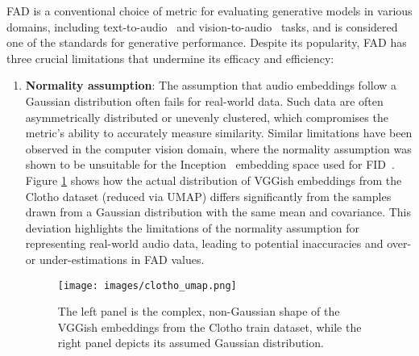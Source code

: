 FAD is a conventional choice of metric for evaluating generative models in various domains, including text-to-audio~\cite{donahue2018adversarial,liu2023audioldm,huang2023makeanaudio,tango,audiogen,t-foley,audioldm2,consistencytta,tango2,tango_llm,auffusion,stableaudio_open,ezaudio} and vision-to-audio~\cite{comunita2024syncfusion,video-foley,rewas,frieren,maskvat,v-aura,vatt,multifoley,ssv2a,vintage,mmaudio,clipsonic,v2a-mapper,im2wav,foleygen,tiva} tasks, and is considered one of the standards for generative performance. Despite its popularity, FAD has three crucial limitations that undermine its efficacy and efficiency:
\begin{enumerate}
\item\textbf{Normality assumption}: The assumption that audio embeddings follow a Gaussian distribution often fails for real-world data. Such data are often asymmetrically distributed or unevenly clustered, which compromises the metric's ability to accurately measure similarity. Similar limitations have been observed in the computer vision domain, where the normality assumption was shown to be unsuitable for the Inception~\cite{inception-v3} embedding space used for FID~\cite{jayasumana2024rethinking}. Figure \ref{fig:clotho_umap} shows how the actual distribution of VGGish embeddings from the Clotho dataset (reduced via UMAP) differs significantly from the samples drawn from a Gaussian distribution with the same mean and covariance. This deviation highlights the limitations of the normality assumption for representing real-world audio data, leading to potential inaccuracies and over- or under-estimations in FAD values.

\begin{figure}[t]
    \centering
    \texttt{[image: images/clotho\_umap.png]}
    \caption{The left panel is the complex, non-Gaussian shape of the VGGish embeddings from the Clotho\cite{drossos2020clotho} train dataset, while the right panel depicts its assumed Gaussian distribution.}
    \label{fig:clotho_umap}
\end{figure}



\end{enumerate}

